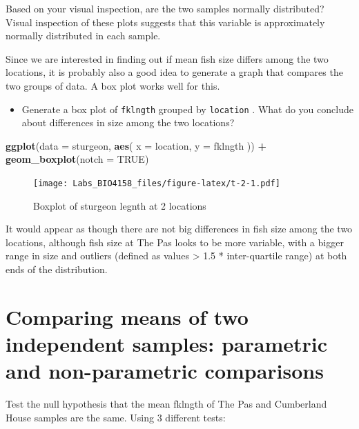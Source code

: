 \documentclass[
  12pt,
]{book}
\newenvironment{Shaded}{\begin{snugshade}}{\end{snugshade}}
\newcommand{\DataTypeTok}[1]{\textcolor[rgb]{0.13,0.29,0.53}{#1}}
\newcommand{\KeywordTok}[1]{\textcolor[rgb]{0.13,0.29,0.53}{\textbf{#1}}}
\newcommand{\NormalTok}[1]{#1}
\newcommand{\OperatorTok}[1]{\textcolor[rgb]{0.81,0.36,0.00}{\textbf{#1}}}
\newcommand{\OtherTok}[1]{\textcolor[rgb]{0.56,0.35,0.01}{#1}}
\newcommand{\StringTok}[1]{\textcolor[rgb]{0.31,0.60,0.02}{#1}}
\providecommand{\tightlist}{%
  \setlength{\itemsep}{0pt}\setlength{\parskip}{0pt}}
\begin{document}
Based on your visual inspection, are the two samples normally distributed?
Visual inspection of these plots suggests that this variable is approximately normally distributed in each sample.

Since we are interested in finding out if mean fish size differs among the two locations, it is probably also a good idea to generate a graph that compares the two groups of data. A box plot works well for this.

\begin{itemize}
\tightlist
\item
  Generate a box plot of \texttt{fklngth} grouped by \texttt{location} . What do you conclude about differences in size among the two locations?
\end{itemize}

\begin{Shaded}
\begin{Highlighting}[]
\KeywordTok{ggplot}\NormalTok{(}\DataTypeTok{data =}\NormalTok{ sturgeon, }\KeywordTok{aes}\NormalTok{(}
  \DataTypeTok{x =}\NormalTok{ location,}
  \DataTypeTok{y =}\NormalTok{ fklngth}
\NormalTok{)) }\OperatorTok{+}
\StringTok{  }\KeywordTok{geom\_boxplot}\NormalTok{(}\DataTypeTok{notch =} \OtherTok{TRUE}\NormalTok{)}
\end{Highlighting}
\end{Shaded}

\begin{figure}
\centering
\texttt{[image: Labs\_BIO4158\_files/figure-latex/t-2-1.pdf]}
\caption{\label{fig:t-2}Boxplot of sturgeon legnth at 2 locations}
\end{figure}

It would appear as though there are not big differences in fish size among the two locations, although fish size at The Pas looks to be more variable, with a bigger range in size and outliers (defined as values \textgreater{} 1.5 * inter-quartile range) at both ends of the distribution.

\hypertarget{comparing-means-of-two-independent-samples-parametric-and-non-parametric-comparisons}{%
\section{Comparing means of two independent samples: parametric and non-parametric comparisons}\label{comparing-means-of-two-independent-samples-parametric-and-non-parametric-comparisons}}

Test the null hypothesis that the mean fklngth of The Pas and Cumberland House samples are the same. Using 3 different tests:
\end{document}
